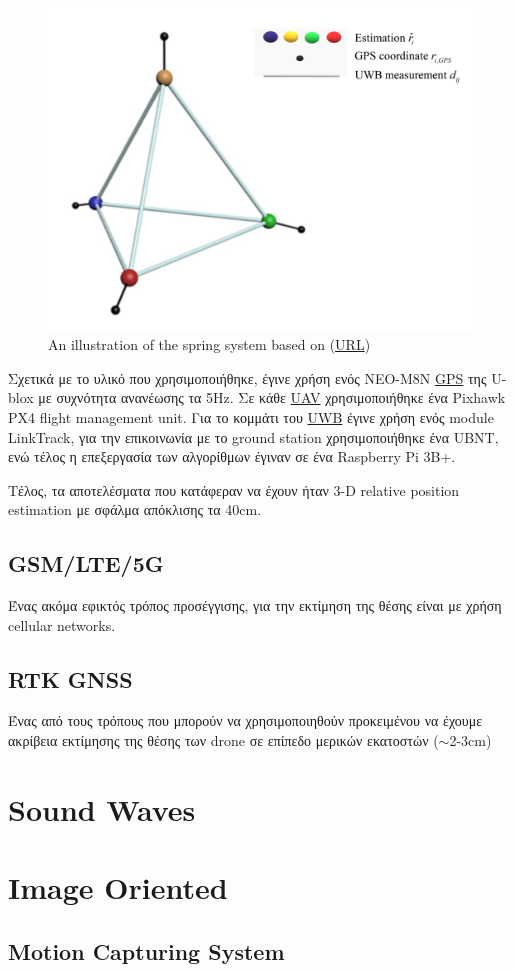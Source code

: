 \begin{figure} [H]
	\centering
	\includegraphics[width=0.5\linewidth]{Images/Related-Work/paper-spring.png}
	\decoRule
	\caption[An illustration of the spring system]{An illustration of the spring system based on \cite{uwb-imu-gps1} (\href{https://www.researchgate.net/publication/345459052_Cooperative_3-D_relative_localization_for_UAV_swarm_by_fusing_UWB_with_IMU_and_GPS}{URL})}
	\label{fig:spring-system}
\end{figure}

Σχετικά με το υλικό που χρησιμοποιήθηκε, έγινε χρήση ενός NEO-M8N \hyperref[abbr:GPS]{GPS} της U-blox με συχνότητα ανανέωσης τα 5Hz.  
Σε κάθε \hyperref[abbr:UAV]{UAV} χρησιμοποιήθηκε ένα Pixhawk PX4 flight management unit. Για το κομμάτι του \hyperref[abbr:UWB]{UWB} έγινε χρήση
ενός module LinkTrack, για την επικοινωνία με το ground station χρησιμοποιήθηκε ένα UBNT, ενώ τέλος η επεξεργασία των αλγορίθμων έγιναν 
σε ένα Raspberry Pi 3B+. 

Τέλος, τα αποτελέσματα που κατάφεραν να έχουν ήταν 3-D relative position estimation με σφάλμα απόκλισης τα 40cm. 

\subsection{GSM/LTE/5G}
Ένας ακόμα εφικτός τρόπος προσέγγισης, για την εκτίμηση της θέσης είναι με χρήση
cellular networks.


\subsection{RTK GNSS}
Ένας από τους τρόπους που μπορούν να χρησιμοποιηθούν προκειμένου να έχουμε ακρίβεια εκτίμησης
της θέσης των drone σε επίπεδο μερικών εκατοστών ($\sim$2-3cm)

\section{Sound Waves}

\cite{sound-waves-for-drone-localization}

\section{Image Oriented}

\subsection{Motion Capturing System}




